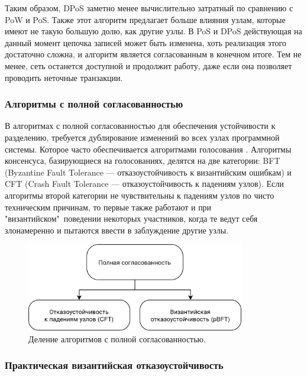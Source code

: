 \documentclass[subf, href, colorlinks=true, 14pt,
times, mtpro, specialist]{disser}
\theoremstyle{definition}
\begin{document}
Таким образом, DPoS заметно менее вычислительно затратный по сравнению с PoW и PoS. Также этот алгоритм предлагает больше влияния узлам, которые имеют не такую большую долю, как другие узлы. В PoS и DPoS действующая на данный момент цепочка записей может быть изменена, хоть реализация этого достаточно сложна, и алгоритм является согласованным в конечном итоге. Тем не менее, сеть останется доступной и продолжит работу, даже если она позволяет проводить неточные транзакции.

\subsubsection{Алгоритмы с полной согласованностью}

В алгоритмах с полной согласованностью для обеспечения устойчивости к разделению, требуется дублирование изменений во всех узлах программной системы. Которое часто обеспечивается алгоритмами голосования \cite{Blockvhain_review}.
Алгоритмы консенсуса, базирующиеся на голосованиях, делятся на две категории: BFT (Byzantine Fault Tolerance — отказоустойчивость к византийским ошибкам) и CFT (Crash Fault Tolerance — отказоустойчивость к падениям узлов). Если алгоритмы второй категории не чувствительны к падениям узлов по чисто техническим причинам, то первые также работают и при "византийском"\ поведении некоторых участников, когда те ведут себя злонамеренно и пытаются ввести в заблуждение другие узлы.

\begin{figure}[H]
\centering
\includegraphics[width=0.85\textwidth]{src/pics/consensus_types_3.png}
\caption{Деление алгоритмов с полной согласованностью.}
\label{fig:consensus_types_3}
\end{figure}

\subsubsection{Практическая византийская отказоустойчивость}
\end{document}

